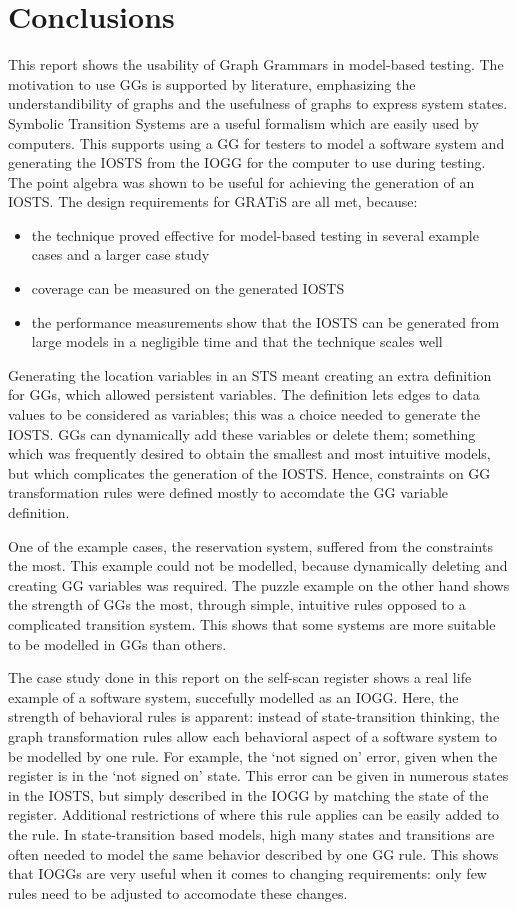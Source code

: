 \section{Conclusions}
This report shows the usability of Graph Grammars in model-based testing. The motivation to use GGs is supported by literature, emphasizing the understandibility of graphs and the usefulness of graphs to express system states. Symbolic Transition Systems are a useful formalism which are easily used by computers. This supports using a GG for testers to model a software system and generating the IOSTS from the IOGG for the computer to use during testing. 
The point algebra was shown to be useful for achieving the generation of an IOSTS. The design requirements for GRATiS are all met, because:
\begin{itemize} 
\item the technique proved effective for model-based testing in several example cases and a larger case study
\item coverage can be measured on the generated IOSTS
\item the performance measurements show that the IOSTS can be generated from large models in a negligible time and that the technique scales well
\end{itemize}

Generating the location variables in an STS meant creating an extra definition for GGs, which allowed persistent variables. The definition lets edges to data values to be considered as variables; this was a choice needed to generate the IOSTS. GGs can dynamically add these variables or delete them; something which was frequently desired to obtain the smallest and most intuitive models, but which complicates the generation of the IOSTS. Hence, constraints on GG transformation rules were defined mostly to accomdate the GG variable definition.

One of the example cases, the reservation system, suffered from the constraints the most. This example could not be modelled, because dynamically deleting and creating GG variables was required. The puzzle example on the other hand shows the strength of GGs the most, through simple, intuitive rules opposed to a complicated transition system. This shows that some systems are more suitable to be modelled in GGs than others.

The case study done in this report on the self-scan register shows a real life example of a software system, succefully modelled as an IOGG. Here, the strength of behavioral rules is apparent: instead of state-transition thinking, the graph transformation rules allow each behavioral aspect of a software system to be modelled by one rule. For example, the `not signed on' error, given when the register is in the `not signed on' state. This error can be given in numerous states in the IOSTS, but simply described in the IOGG by matching the state of the register. Additional restrictions of where this rule applies can be easily added to the rule. In state-transition based models, high many states and transitions are often needed to model the same behavior described by one GG rule. This shows that IOGGs are very useful when it comes to changing requirements: only few rules need to be adjusted to accomodate these changes.


